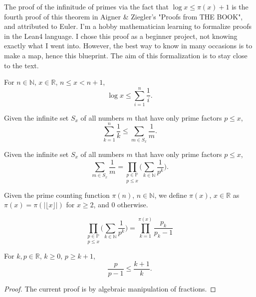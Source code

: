 The proof of the infinitude of primes via the fact that $\log x\le \pi(x)+1$ is the fourth proof of this theorem in Aigner \& Ziegler's "Proofs from THE BOOK", and attributed to Euler. I'm a hobby mathematician learning to formalize proofs in the Lean4 language. I chose this proof as a beginner project, not knowing exactly what I went into. However,  the best way to know in many occasions is to make a map, hence this blueprint. The aim of this formalization is to stay close to the text.


\begin{lemma}
\label{lem:lemma0}
\leanok
For $n\in\mathbb{N}$, $x\in\mathbb{R}$, $n\le x < n+1$,
$$\log x \le \sum_{i=1}^n\frac1i.$$
\end{lemma}

\begin{lemma}
\label{lem:lemma1}
\leanok
Given the infinite set $S_x$ of all numbers $m$ that have only prime factors $p\le x$,
    $$\sum_{k=1}^n\frac1k \le \sum_{m\in S_x}\frac{1}{m}. $$
\end{lemma}

\begin{lemma}
\label{lem:lemma2}
\leanok
Given the infinite set $S_x$ of all numbers $m$ that have only prime factors $p\le x$,
    $$\sum_{m\in S_x}\frac{1}{m} = \underset{p\le x}{\prod_{p\in\mathbb{P}}}\Big(\sum_{k\in\mathbb{N}}\frac{1}{p^k}\Big).$$
\end{lemma}

\begin{definition-pre}
\label{def:piReal}
Given the prime counting function $\pi(n)$, $n\in\mathbb{N}$, we define $\pi(x)$, $x\in\mathbb{R}$ as $\pi(x) = \pi(|\lfloor x\rfloor|)$ for $x\ge2$, and $0$ otherwise.
\end{definition-pre}

\begin{lemma}
\label{lem:lemma3}
    $$\underset{p\le x}{\prod_{p\in\mathbb{P}}}\Big(\sum_{k\in\mathbb{N}}\frac{1}{p^k}\Big) = \prod_{k=1}^{\pi(x)}\frac{p_k}{p_k-1}$$
\end{lemma}

\begin{lemma}
\label{lem:lemma4-1}
\leanok
For $k,p \in\mathbb{R}$, $k\ge0$, $p \ge k+1$,
$$\frac{p}{p-1} \le \frac{k+1}{k}.$$
\end{lemma}
\begin{proof}
\leanok
The current proof is by algebraic manipulation of fractions.
\end{proof}

